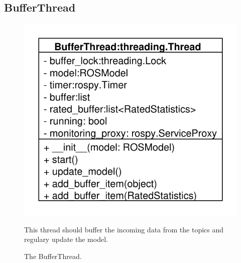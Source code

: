 \subsection{BufferThread}
\begin{figure}[htbp]
	\begin{minipage}[t]{7cm}
		\vspace{0pt}
		\centering
		\includegraphics[scale=0.6]{./diagram_pictures/BufferThread.pdf}
		\caption{The BufferThread.}
	\end{minipage}
	\hfill
	\begin{minipage}[t]{8cm}
		\vspace{10pt}
		This thread should buffer the incoming data from the topics and regulary
		update the model.
	\end{minipage}
\end{figure}
